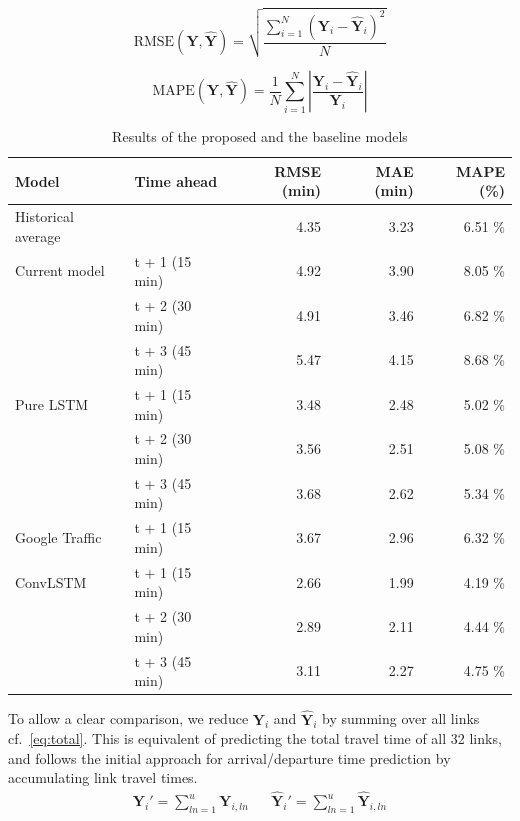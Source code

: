\documentclass[preprint,11pt,5p,twocolumn]{elsarticle}
\newcommand{\matr}[1]{\mathbf{#1}}
\begin{document}
\begin{equation}
    \textrm{RMSE}(\matr{Y}, \matr{\widehat{Y}}) = \sqrt{\frac{\sum_{i = 1}^{N} \left(\matr{Y}_i - \matr{\widehat{Y}}_i \right)^2}{N}}
    \label{eq:rmse}
\end{equation}

\begin{equation}
    \textrm{MAPE}(\matr{Y}, \matr{\widehat{Y}}) = \frac{1}{N} \sum_{i = 1}^{N} \left| \frac{\matr{Y}_i - \matr{\widehat{Y}}_i}{\matr{Y}_i} \right| 
    \label{eq:mape} 
\end{equation}
\vspace{.5em}

\begin{table}[!t]
    \center
    \begin{tabular}{ll|rrr}
        Model & Time ahead & RMSE (min) & MAE (min) & MAPE (\%) \\
        \hline         
        \hline
        Historical average &                & 4.35 & 3.23 & 6.51 \% \\ 
        \hline 
        Current model      & t + 1 (15 min) & 4.92 & 3.90 & 8.05 \% \\
                           & t + 2 (30 min) & 4.91 & 3.46 & 6.82 \% \\
                           & t + 3 (45 min) & 5.47 & 4.15 & 8.68 \% \\
        \hline 
        Pure LSTM          & t + 1 (15 min) & 3.48 & 2.48 & 5.02 \% \\
                           & t + 2 (30 min) & 3.56 & 2.51 & 5.08 \% \\
                           & t + 3 (45 min) & 3.68 & 2.62 & 5.34 \% \\
        \hline 
        Google Traffic     & t + 1 (15 min) & 3.67 & 2.96 & 6.32 \% \\ 
        \hline 
        ConvLSTM           & t + 1 (15 min) & 2.66 & 1.99 & 4.19 \% \\
                           & t + 2 (30 min) & 2.89 & 2.11 & 4.44 \% \\
                           & t + 3 (45 min) & 3.11 & 2.27 & 4.75 \% \\
        \hline 
    \end{tabular}
    \caption{Results of the proposed and the baseline models}
    \label{tab:results}
\end{table}

To allow a clear comparison, we reduce $\matr{Y}_i$ and $\matr{\widehat{Y}}_i$ by summing over all links cf.~\cref{eq:total}. This is equivalent of predicting the total travel time of all 32 links, and follows the initial approach for arrival/departure time prediction by accumulating link travel times.
\begin{align}
    \matr{Y}_i' = \sum_{\mathit{ln} = 1}^{u} \matr{Y}_{i,\mathit{ln}} & & \matr{\widehat{Y}}_i' = \sum_{\mathit{ln} = 1}^{u} \matr{\widehat{Y}}_{i,\mathit{ln}}
    \label{eq:total} 
\end{align}
\end{document}

